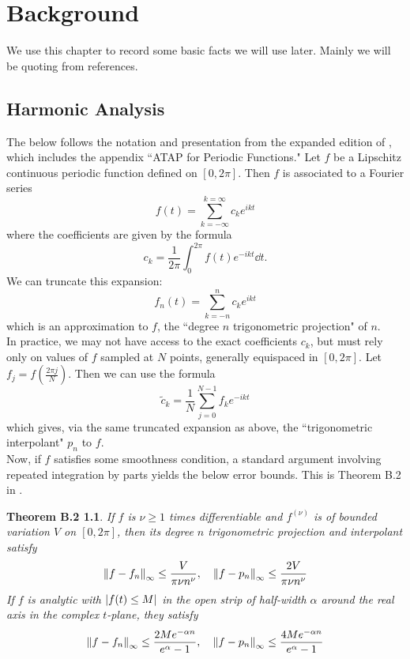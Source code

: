 \chapter{Background\label{chap:background}}

We use this chapter to record some basic facts we will use later.  Mainly we will be quoting from references.

\section{Harmonic Analysis\label{sec:Harmonic}}
The below follows the notation and presentation from the expanded edition of \cite{trefethenATAP}, which includes the appendix ``ATAP for Periodic Functions."  Let $f$ be a Lipschitz continuous periodic function defined on $[0,2 \pi]$.  Then $f$ is associated to a Fourier series
\[  f(t) = \sum_{k=-\infty}^{k=\infty} c_k e^{ikt}\]
where the coefficients are given by the formula
\[c_k = \frac{1}{2\pi}  \int_{0}^{2\pi} f(t) e^{-ikt} \dd{t}. \]
We can truncate this expansion:
\[f_n(t) = \sum_{k=-n}^{n} c_k e^{ikt}\]
which is an approximation to $f$, the ``degree $n$ trigonometric projection" of $n$.\\
In practice, we may not have access to the exact coefficients $c_k$, but must rely only on values of $f$ sampled at $N$ points, generally equispaced in $[0,2\pi]$. Let $f_j = f \left( \frac{2 \pi j  }{N} \right)$.  Then we can use the formula
\[  \tilde{c}_k = \frac{1}{N} \sum_{j=0}^{N-1} f_k e^{-ikt}\] 
 which gives, via the same truncated expansion as above, the ``trigonometric interpolant" $p_n$ to $f$.   \\
 
 Now, if $f$ satisfies some smoothness condition, a standard argument involving repeated integration by parts yields the below error bounds.  This is Theorem B.2 in \cite[Appendix B]{trefethenATAP}.
 
 \newtheorem*{ATAPB-2}{Theorem B.2} 
 \begin{ATAPB-2}If $f$ is $\nu \geq 1$ times differentiable and $f^{(\nu)}$ is of bounded 
 variation $V$ on $[0,2\pi]$, then its degree $n$ trigonometric projection and interpolant satisfy
 \[ \norm{f - f_n}_\infty \leq \frac{V}{\pi \nu n^\nu}, \quad \norm{f - p_n}_\infty \leq \frac{2V}{\pi \nu n^\nu} \]
 If $f$ is analytic with $\abs{f(t) \leq M}$ in the open strip of half-width $\alpha$ around the real axis in the complex $t$-plane, they satisfy
 \[ \norm{f - f_n}_\infty \leq \frac{2Me^{-\alpha n}}{e^\alpha-1}, \quad \norm{f - p_n}_\infty \leq \frac{4M e^{-\alpha n}}{e^\alpha -1} \]
 \end{ATAPB-2}

